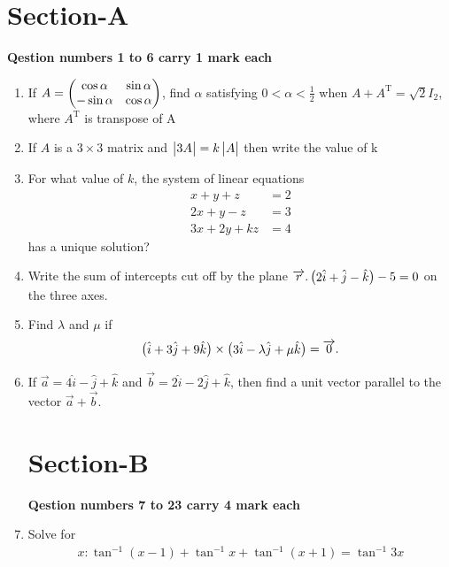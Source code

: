 \documentclass[journal,12pt,onecolumn]{IEEEtran}
\renewcommand\thesection{\arabic{section}}
\begin{document}
\section{Section-A}
\textbf{Qestion numbers 1 to 6 carry 1 mark each}\\
\renewcommand{\theequation}{\theenumi}
\begin{enumerate}[label=\thesection.\arabic*.,ref=\thesection.\theenumi]
\item If $A = \begin{pmatrix}\cos \alpha & \sin \alpha\\ -\sin \alpha & \cos \alpha\end{pmatrix}$, find $\alpha$ satisfying $0<\alpha<\frac{1}{2}$ when $A + A^{\text{T}} = \sqrt{2}I_{2}$, where $A^{\text{T}}$ is transpose of A

\item If $A$ is a $3\times3$ matrix and $\begin{vmatrix}3A\end{vmatrix} = k \begin{vmatrix}A\end{vmatrix}$ then write the value of k

\item For what value of $k$, the system of linear equations 
	\begin{align}
		x+y+z &= 2\\
		2x+y-z &=3\\
		3x+2y+kz &=4
	\end{align}
	has a unique solution? 

\item Write the sum of intercepts cut off by the plane $\overrightarrow{r}.\begin{pmatrix}2\hat{i}+\hat{j}-\hat{k}\end{pmatrix} - 5 = 0$ on the three axes.

\item Find $\lambda$ and $\mu$ if
	\begin{align}
		\begin{pmatrix}\hat{i} + 3\hat{j} + 9\hat{k}\end{pmatrix} \times \begin{pmatrix}3\hat{i} - \lambda \hat{j} + \mu \hat{k}\end{pmatrix} = \overrightarrow{0}.
	\end{align}

\item If $\overrightarrow{a} = 4\hat{i} - \hat{j} +\hat{k}$ and $\overrightarrow{b} = 2\hat{i} - 2\hat{j} + \hat{k}$, then find a unit vector parallel to the vector $\overrightarrow{a}+\overrightarrow{b}$.

\section{Section-B}
\textbf{Qestion numbers 7 to 23 carry 4 mark each}\\
\item Solve for 
	\begin{align}
		x: \tan^{-1}(x-1) + \tan^{-1}x + \tan^{-1}(x+1) = \tan^{-1}3x
	\end{align}


\end{enumerate}
\end{document}

